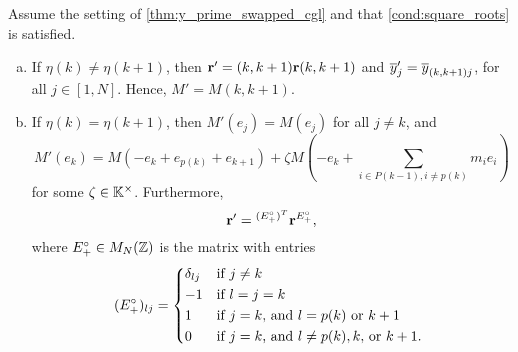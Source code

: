 \begin{theorem}\label{thm:almost_mutation_toric_frame}

	Assume the setting of \cref{thm:y_prime_swapped_cgl} and that \cref{cond:square_roots}
	is satisfied.
	\begin{enumerate}[(a)]
		\item If $\eta(k) \neq \eta(k+1)$, then $\mathbf{r}' = (k, k+1)\mathbf{r} (k, k+1)$ and $\overline{y}'_j =
			      \overline{y}_{(k, k+1)j}$, for all $j \in [1, N]$. Hence, $M' = M(k, k+1)$.
		\item If $\eta(k) = \eta(k+1)$, then $M'(e_j) = M(e_j)$ for all $j \neq k$, and
		      \begin{equation}\label{eq:M'_of_ek}
			      M'(e_k) = M(-e_k + e_{p(k)} + e_{k+1}) + \zeta M\left(-e_k + \sum_{i \in P(k-1), i\neq p(k)}m_ie_i\right)
		      \end{equation}
		      for some $\zeta \in \mathbb{K}^\times$. Furthermore,
		      \begin{equation*}
			      \mathbf{r}' = \prescript{(E_{+}^\circ)^T}{}{\mathbf{r}}^{E^\circ_{+}},
		      \end{equation*}
		      where $E^\circ_{+}\in M_N(\mathbb{Z})$ is the matrix with entries
		      \begin{equation*}
			      (E^\circ_{+})_{lj} = \begin{dcases*}
				      \delta_{lj} & if $j \neq k$                               \\
				      -1          & if $l = j = k$                              \\
				      1           & if $j=k$, and $l= p(k)$ or $k+1$            \\
				      0           & if $j = k$, and $l \neq p(k), k,$ or $k+1$.
			      \end{dcases*}
		      \end{equation*}
	\end{enumerate}
\end{theorem}
